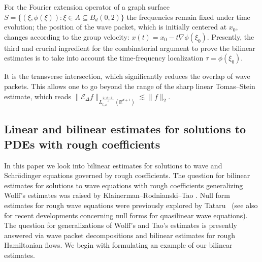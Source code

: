 \documentclass{amsart}
\theoremstyle{definition}
\newcommand{\R}{\mathbb{R}}
\begin{document}
For the Fourier extension operator of a graph surface $S = \{(\xi,\phi(\xi)) : \xi \in A \subseteq B_d(0,2) \}$ the frequencies remain fixed under time evolution; the position of the wave packet, which is initially centered at $x_0$, changes according to the group velocity: $x(t) = x_0 - t \nabla \phi(\xi_0)$. Presently, the third and crucial ingredient for the combinatorial argument to prove the bilinear estimates is to take into account the time-frequency localization $\tau = \phi(\xi_0)$.

It is the transverse intersection, which significantly reduces the overlap of wave packets. This allows one to go beyond the range of the sharp linear Tomas--Stein estimate, which reads $\| \mathcal{E}_{\Delta} f \|_{L_{t,x}^\frac{2(d+2)}{d}(\R^{d+1})} \lesssim \| f \|_2$.

\subsection{Linear and bilinear estimates for solutions to PDEs with rough coefficients}

In this paper we look into bilinear estimates for solutions to wave and Schr\"odinger equations governed by rough coefficients. The question for bilinear estimates for solutions to wave equations with rough coefficients generalizing Wolff's estimates was raised by Klainerman--Rodnianski--Tao \cite[Section~8]{KlainermanRodnianskiTao2002}. Null form estimates for rough wave equations were previously explored by Tataru~\cite{Tataru03} (see also \cite{AiIfrimTataru2024} for recent developments concerning null forms for quasilinear wave equations). The question for generalizations of Wolff's and Tao's estimates is presently answered via wave packet decompositions and bilinear estimates for rough Hamiltonian flows. We begin with formulating an example of our bilinear estimates. 

\medskip 
\end{document}
